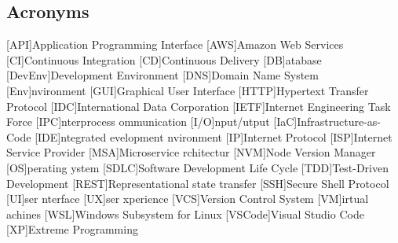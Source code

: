 \newcommand{\abbr}{Abbreviations}
\subsection{Acronyms}

\begin{acronym}[1234567890]		%
\setlength{\itemsep}{-\parsep}	%

[API]{Application Programming Interface}
[AWS]{Amazon Web Services}
[CI]{Continuous Integration}
[CD]{Continuous Delivery}
[DB]{atabase}
[DevEnv]{Development Environment}
[DNS]{Domain Name System}
[Env]{nvironment}
[GUI]{Graphical User Interface}
[HTTP]{Hypertext Transfer Protocol}
[IDC]{International Data Corporation}
[IETF]{Internet Engineering Task Force}
[IPC]{nterprocess ommunication}
[I/O]{nput/utput}
[IaC]{Infrastructure-as-Code}
[IDE]{ntegrated evelopment nvironment}
[IP]{Internet Protocol}
[ISP]{Internet Service Provider}
[MSA]{Microservice rchitectur}
[NVM]{Node Version Manager}
[OS]{perating ystem}
[SDLC]{Software Development Life Cycle}
[TDD]{Test-Driven Development}
[REST]{Representational state transfer}
[SSH]{Secure Shell Protocol}
[UI]{ser nterface}
[UX]{ser xperience}
[VCS]{Version Control System}
[VM]{irtual achines}
[WSL]{Windows Subsystem for Linux}
[VSCode]{Visual Studio Code}
[XP]{Extreme Programming}
\end{acronym}
